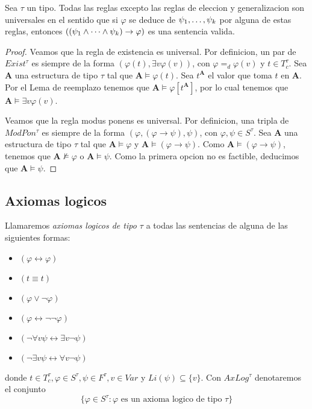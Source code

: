\begin{lemma}
  Sea $\tau$ un tipo. Todas las reglas excepto las reglas de eleccion y generalizacion son universales en el sentido que si $\varphi$ se deduce de $\succession{\psi}{1}{k}$ por alguna de estas reglas,
  entonces $((\succession[\land]{\psi}{1}{k})\rightarrow\varphi)$ es una sentencia valida.
\end{lemma}
\begin{proof}
  Veamos que la regla de existencia es universal. Por definicion, un par de $Exist^{\tau }$
  es siempre de la forma $(\varphi (t),\exists v\varphi (v))$,
  con $\varphi =_{d}\varphi (v)$ y $t\in T_{c}^{\tau }$. Sea $\mathbf{A}$ una
  estructura de tipo $\tau $ tal que $\mathbf{A}\models \varphi (t)$. Sea $t^{\mathbf{A}}$
  el valor que toma $t$ en $\mathbf{A}$. Por el Lema de reemplazo
  tenemos que $\mathbf{A}\models \varphi \left[ t^{\mathbf{A}}\right] $, por
  lo cual tenemos que $\mathbf{A}\models \exists v\varphi (v)$.
  
  Veamos que la regla modus ponens es universal. Por definicion, una tripla de $ModPon^\tau$
  es siempre de la forma $(\varphi,(\varphi\rightarrow\psi), \psi)$, con $\varphi,\psi \in S^\tau$.
  Sea $\mathbf{A}$ una estructura de tipo $\tau$ tal que $\mathbf{A}\models\varphi$ y $\mathbf{A}\models(\varphi\rightarrow\psi)$.
  Como $\mathbf{A}\models(\varphi\rightarrow\psi)$, tenemos que $\mathbf{A}\not\models\varphi$ o $\mathbf{A}\models\psi$. Como 
  la primera opcion no es factible, deducimos que $\mathbf{A}\models\psi$.
\end{proof}

\subsection{Axiomas logicos}
\begin{definition}
  Llamaremos \emph{axiomas logicos de tipo $\tau$} a todas las sentencias de alguna de las siguientes formas:
  \begin{itemize}
    \item $(\varphi\leftrightarrow\varphi)$
    \item $(t\equiv t)$
    \item $(\varphi\lor\neg\varphi)$
    \item $(\varphi\leftrightarrow\neg\neg\varphi)$
    \item $(\neg\forall v\psi\leftrightarrow\exists v\neg\psi)$
    \item $(\neg\exists v\psi\leftrightarrow\forall v\neg\psi)$
  \end{itemize}
  donde $t \in T_c^\tau, \varphi\in S^\tau, \psi\in F^\tau, v\in Var$ y $Li(\psi) \subseteq \{v\}$. Con $AxLog^\tau$ denotaremos el conjunto
  $$
  \{\varphi \in S^\tau : \varphi \text{ es un axioma logico de tipo } \tau\}
  $$
\end{definition}

